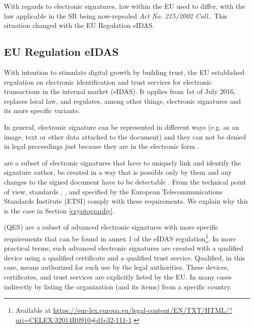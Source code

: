\documentclass[thesismargins, english, thesislinespacing, onelinechapterstyle, upjsfrontpage]{rnthesis}
\begin{document}
With regards to electronic signatures, law within the EU used to differ, with the law applicable in the SR being now-repealed \textit{Act No. 215/2002 Coll.}. This situation changed with the EU Regulation eIDAS.

\subsection{EU Regulation eIDAS} \label{eidas}

With intention to stimulate digital growth by building trust, the EU established regulation on electronic identification and trust services for electronic transactions in the internal market (eIDAS).
It applies from 1st of July 2016, replaces local law, and regulates, among other things, electronic signatures and its more specific variants.


In general, electronic signature can be represented in different ways (e.g. as an image, text or other data attached to the document) and they can not be denied in legal proceedings just because they are in the electronic form \cite{eidas}.

 are a subset of electronic signatures that have to uniquely link and identify the signature author, be created in a way that is possible only by them and any changes to the signed document have to be detectable \cite{eidas}.
From the technical point of view, standards , , and  specified by the European Telecommunications Standards Institute (ETSI) comply with these requirements. We explain why this is the case in Section \ref{cryptography}.

 (QES) are a subset of advanced electronic signatures with more specific requirements that can be found in annex 1 of the eIDAS regulation\footnote{Available at \url{https://eur-lex.europa.eu/legal-content/EN/TXT/HTML/?uri=CELEX:32014R0910\#d1e32-111-1}.}.
In more practical terms, such advanced electronic signatures are created with a qualified device using a qualified certificate and a qualified trust service.
Qualified, in this case, means authorized for such use by the legal authorities.
These devices, certificates, and trust services are explicitly listed by the EU. In many cases indirectly by listing the organization (and its items) from a specific country.
\end{document}
